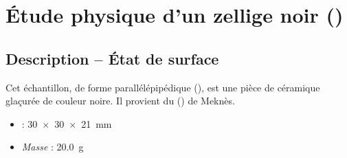 
\chapter{Étude physique d'un zellige noir ()}

\section{Description -- État de surface}

Cet échantillon, de forme parallélépipédique (), est 
une pièce de céramique glaçurée de couleur  noire. Il provient du \PaM 
() de Meknès.

\begin{itemize}
  \item \DimText : \SI{30x30x21}{\mm}
  \item \emph{Masse} : \SI{20.0}{\g}
\end{itemize}

